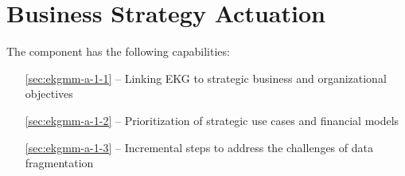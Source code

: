 \chapter{Business Strategy Actuation}\label{ch:ekgmm-a-1} %

The  component has the following capabilities:

\begin{itemize}[leftmargin=.5in]
  \item [\ref{sec:ekgmm-a-1-1}]  -- Linking EKG to strategic business and organizational objectives
  \item [\ref{sec:ekgmm-a-1-2}]  -- Prioritization of strategic use cases and financial models
  \item [\ref{sec:ekgmm-a-1-3}]  -- Incremental steps to address the challenges of data fragmentation
\end{itemize}




